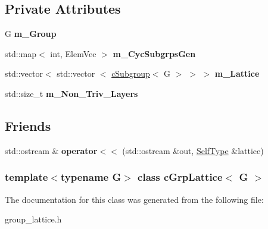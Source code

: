 \subsection*{\-Private \-Attributes}
\begin{DoxyCompactItemize}
\item 
\hypertarget{classcGrpLattice_adf219732413e288dd67173189a556bba}{
\-G {\bfseries m\-\_\-\-Group}}
\label{classcGrpLattice_adf219732413e288dd67173189a556bba}

\item 
\hypertarget{classcGrpLattice_a016e9d166b7cd74ef416bb4c4a22dfcc}{
std\-::map$<$ int, \-Elem\-Vec $>$ {\bfseries m\-\_\-\-Cyc\-Subgrps\-Gen}}
\label{classcGrpLattice_a016e9d166b7cd74ef416bb4c4a22dfcc}

\item 
\hypertarget{classcGrpLattice_a8a7ab9311e816bfa58c1f8ba727c5033}{
std\-::vector$<$ std\-::vector\*
$<$ \hyperlink{classcSubgroup}{c\-Subgroup}$<$ \-G $>$ $>$ $>$ {\bfseries m\-\_\-\-Lattice}}
\label{classcGrpLattice_a8a7ab9311e816bfa58c1f8ba727c5033}

\item 
\hypertarget{classcGrpLattice_a2060764d98fd699bc63323b1d5eafb63}{
std\-::size\-\_\-t {\bfseries m\-\_\-\-Non\-\_\-\-Triv\-\_\-\-Layers}}
\label{classcGrpLattice_a2060764d98fd699bc63323b1d5eafb63}

\end{DoxyCompactItemize}
\subsection*{\-Friends}
\begin{DoxyCompactItemize}
\item 
\hypertarget{classcGrpLattice_a96ca24361f58299e265ac93d1296733b}{
std\-::ostream \& {\bfseries operator$<$$<$} (std\-::ostream \&out, \hyperlink{classcGrpLattice}{\-Self\-Type} \&lattice)}
\label{classcGrpLattice_a96ca24361f58299e265ac93d1296733b}

\end{DoxyCompactItemize}
\subsubsection*{template$<$typename G$>$ class c\-Grp\-Lattice$<$ G $>$}



\-The documentation for this class was generated from the following file\-:\begin{DoxyCompactItemize}
\item 
group\-\_\-lattice.\-h\end{DoxyCompactItemize}
